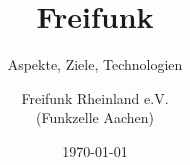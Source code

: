 \title{Freifunk}
\subtitle{Aspekte, Ziele, Technologien}
\author{Freifunk Rheinland e.V.\\(Funkzelle Aachen)}
\date{\today}